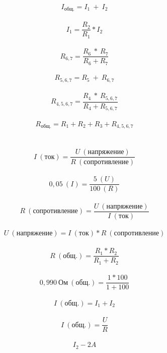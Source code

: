\documentclass[a4paper]{article}
\begin{document}
	
	\[
	I_{общ.} = {I_{1} \ + \ I_{2}}
	\]
	\\
	\[
	I_{1} = \frac{R_{2}} {R_{1}} * I_{2}
	\]
	\\
	\[
	R_{6,7} = \frac{R_{6} \  * \ R_{7}}{R_{6} + R_{7}}
	\]
	\\
	\[
	R_{5,6,7} = {R_{5} \  + \ R_{6,7}}
	\]
	\\
	\[
	R_{4,5,6,7} = \frac{R_{4} \  * \ R_{5,6,7}}{R_{4} + R_{5,6,7}}
	\]
	\\
	\[
	R_{общ.} = {R_{1} + R_{2} + R_{3} + R_{4,5,6,7}}
	\]
	\\
	\\
	\[
	I \ (ток) = \frac{U \ (напряжение)}{R \ (сопротивление)}
	\]
	\\
	\[
	0,05 \ (I) = \frac{5 \ (U)}{100 \ (R)}
	\]
	\\
	\[
	R \ (сопротивление) = \frac{U \ (напряжение)}{I \ (ток)}
	\]
	\\
	\[
	U \ (напряжение) = I \ (ток) * R \ (сопротивление)
	\]
	\\
	\[
	R \ (общ.) = \frac{R_{1} * R_{2}}{R_{1} + R_{2}}
	\]
	\\
	\[
	0,990 \ Ом \ (общ.) = \frac{1 * 100}{1 + 100}
	\]
	\\
	\[
	I \ (общ.) = I_{1} + I_{2}
	\]
	\\
	\[
	I \ (общ.) = \frac{U}{R}
	\]
	\\
	\[
	I_{2} - 2A
	\]
	
	
\end{document}
